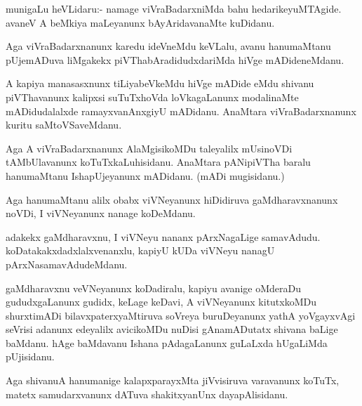 \documentclass{article}
\begin{document}
\begin{mn}
munigaLu  heVLidaru:- namage  viVraBadarxniMda  bahu  hedarikeyuMTAgide.  avaneV  A beMkiya  
maLeyanunx  bAyAridavanaMte  kuDidanu.
\end{mn}

\begin{mn}
Aga  viVraBadarxnanunx  karedu  ideVneMdu  keVLalu,  avanu  hanumaMtanu  pUjemADuva  liMgakekx  
piVThabAradidudxdariMda  hiVge  mADideneMdanu.
\end{mn}

\begin{mn}
A  kapiya  manasasxnunx  tiLiyabeVkeMdu  hiVge  mADide  eMdu  shivanu  piVThavanunx  kalipxsi  
suTuTxhoVda  loVkagaLanunx  modalinaMte  mADidudalalxde  ramayxvanAnxgiyU  mADidanu.  AnaMtara  
viVraBadarxnanunx  kuritu  saMtoVSaveMdanu.
\end{mn}

\begin{mn}
Aga  A  viVraBadarxnanunx  AlaMgisikoMDu  taleyalilx  mUsinoVDi  tAMbUlavanunx  koTuTxkaLuhisidanu.  
AnaMtara  pANipiVTha  baralu  hanumaMtanu  IshapUjeyanunx  mADidanu.  (mADi  mugisidanu.)
\end{mn}

\begin{mn}
Aga  hanumaMtanu  alilx  obabx  viVNeyanunx  hiDidiruva  gaMdharavxnanunx  noVDi,  I  viVNeyanunx  nanage  koDeMdanu.
\end{mn}

\begin{mn}
adakekx  gaMdharavxnu,  I  viVNeyu  nananx  pArxNagaLige  samavAdudu.  koDatakakxdadxlalxvenanxlu, 
kapiyU  kUDa  viVNeyu  nanagU  pArxNasamavAdudeMdanu.
\end{mn}

\begin{mn}
gaMdharavxnu  veVNeyanunx  koDadiralu,  kapiyu  avanige  oMderaDu  gududxgaLanunx  gudidx,  keLage  
keDavi,  A  viVNeyanunx  kitutxkoMDu  shurxtimADi  bilavxpaterxyaMtiruva  soVreya  buruDeyanunx  
yathA  yoVgayxvAgi  seVrisi  adanunx  edeyalilx  avicikoMDu  nuDisi  gAnamADutatx  shivana  baLige  
baMdanu.  hAge  baMdavanu  Ishana  pAdagaLanunx  guLaLxda  hUgaLiMda  pUjisidanu.
\end{mn}

\begin{mn}
Aga  shivanuA  hanumanige  kalapxparayxMta  jiVvisiruva  varavanunx  koTuTx,  matetx  samudarxvanunx 
dATuva  shakitxyanUnx  dayapAlisidanu.
\end{mn}
\end{document}
